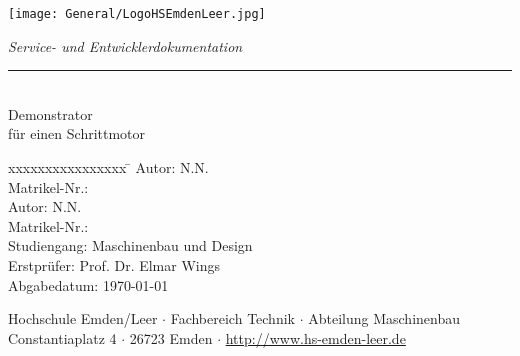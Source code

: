 %
%
%

\begin{titlepage}
    
    \begin{flushleft} 
        \texttt{[image: General/LogoHSEmdenLeer.jpg]}
    \end{flushleft} 
    
    \begin{flushright}
        \vspace{2cm}
        \LARGE \textsl{Service- und Entwicklerdokumentation}\\
        \rule{0.6\textwidth}{0.4pt} ~\\
        \vspace{0.5cm}
        \textsf{\LARGE Demonstrator}\\
        \textsf{\LARGE für einen Schrittmotor}
    \end{flushright}
    
    \vspace{3cm}
    \large
    \begin{tabbing}
        xxxxxxxxxxxxxxxx \= \kill
        Autor:			\> N.N. \\
        Matrikel-Nr.:	 \\
        Autor:			\> N.N. \\
        Matrikel-Nr.:	 \\




        Studiengang: \> Maschinenbau und Design \\ [0.5cm]
        Erstprüfer: \> Prof. Dr. Elmar Wings \\
        Abgabedatum: \> \today \\
    \end{tabbing}
    
  	\vspace{3cm}
    \small
    \begin{center}
        Hochschule Emden/Leer $\cdot$ 
        Fachbereich Technik $\cdot$ 
        Abteilung Maschinenbau \\
        Constantiaplatz 4 $\cdot$ 
        26723 Emden $\cdot$ 
        \url{http://www.hs-emden-leer.de}
    \end{center}
    
\end{titlepage}
